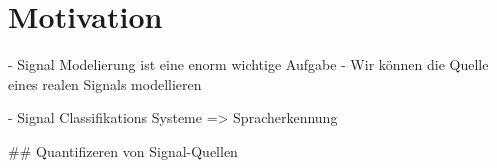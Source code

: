 \section{Motivation}

- Signal Modelierung ist eine enorm wichtige Aufgabe
- Wir können die Quelle eines realen Signals modellieren

- Signal Classifikations Systeme => Spracherkennung


## Quantifizeren von Signal-Quellen
